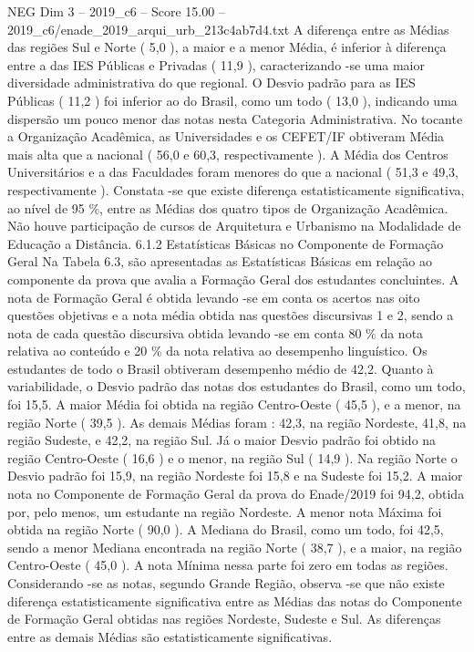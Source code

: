 \begin{textsample}{NEG Dim 3 – 2019\_c6 – Score 15.00 – 2019\_c6/enade\_2019\_arqui\_urb\_213c4ab7d4.txt}
A diferença entre as Médias das regiões Sul e Norte ( 5,0 ), a maior e a menor Média, é inferior à diferença entre a das IES Públicas e Privadas ( 11,9 ), caracterizando -se uma maior diversidade administrativa do que regional.
O Desvio padrão para as IES Públicas ( 11,2 ) foi inferior ao do Brasil, como um todo ( 13,0 ), indicando uma dispersão um pouco menor das notas nesta Categoria Administrativa.
No tocante a Organização Acadêmica, as Universidades e os CEFET/IF obtiveram Média mais alta que a nacional ( 56,0 e 60,3, respectivamente ).
A Média dos Centros Universitários e a das Faculdades foram menores do que a nacional ( 51,3 e 49,3, respectivamente ).
Constata -se que existe diferença estatisticamente significativa, ao nível de 95 \%, entre as Médias dos quatro tipos de Organização Acadêmica.
Não houve participação de cursos de Arquitetura e Urbanismo na Modalidade de Educação a Distância. 6.1.2 Estatísticas Básicas no Componente de Formação Geral Na Tabela 6.3, são apresentadas as Estatísticas Básicas em relação ao componente da prova que avalia a Formação Geral dos estudantes concluintes.
A nota de Formação Geral é obtida levando -se em conta os acertos nas oito questões objetivas e a nota média obtida nas questões discursivas 1 e 2, sendo a nota de cada questão discursiva obtida levando -se em conta 80 \% da nota relativa ao conteúdo e 20 \% da nota relativa ao desempenho linguístico.
Os estudantes de todo o Brasil obtiveram desempenho médio de 42,2.
Quanto à variabilidade, o Desvio padrão das notas dos estudantes do Brasil, como um todo, foi 15,5.
A maior Média foi obtida na região Centro-Oeste ( 45,5 ), e a menor, na região Norte ( 39,5 ).
As demais Médias foram : 42,3, na região Nordeste, 41,8, na região Sudeste, e 42,2, na região Sul.
Já o maior Desvio padrão foi obtido na região Centro-Oeste ( 16,6 ) e o menor, na região Sul ( 14,9 ).
Na região Norte o Desvio padrão foi 15,9, na região Nordeste foi 15,8 e na Sudeste foi 15,2.
A maior nota no Componente de Formação Geral da prova do Enade/2019 foi 94,2, obtida por, pelo menos, um estudante na região Nordeste.
A menor nota Máxima foi obtida na região Norte ( 90,0 ).
A Mediana do Brasil, como um todo, foi 42,5, sendo a menor Mediana encontrada na região Norte ( 38,7 ), e a maior, na região Centro-Oeste ( 45,0 ).
A nota Mínima nessa parte foi zero em todas as regiões.
Considerando -se as notas, segundo Grande Região, observa -se que não existe diferença estatisticamente significativa entre as Médias das notas do Componente de Formação Geral obtidas nas regiões Nordeste, Sudeste e Sul.
As diferenças entre as demais Médias são estatisticamente significativas.

\end{textsample}
